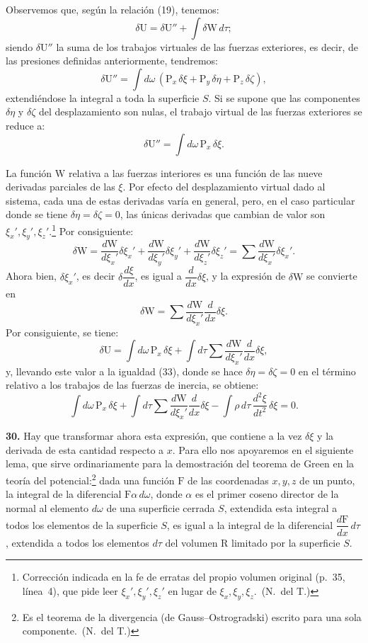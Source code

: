 Observemos que, según la relación (19), tenemos:
\[
\delta\mathrm{U}=\delta\mathrm{U}''+\int\delta\mathrm{W}\,d\tau;
\]
siendo $\delta\mathrm{U}''$ la suma de los trabajos virtuales de las
fuerzas exteriores, es decir, de las presiones definidas anteriormente,
tendremos:
\[
\delta\mathrm{U}''=\int d\omega\,(\mathrm{P}_x\,\delta\xi+\mathrm{P}_y\,\delta\eta+\mathrm{P}_z\,\delta\zeta),
\]
extendiéndose la integral a toda la superficie $S$. Si se supone que las
componentes $\delta\eta$ y $\delta\zeta$ del desplazamiento son nulas, el
trabajo virtual de las fuerzas exteriores se reduce a:
\[
\delta\mathrm{U}''=\int d\omega\,\mathrm{P}_x\,\delta\xi.
\]

La función $\mathrm{W}$ relativa a las fuerzas
interiores es una función de las nueve derivadas parciales de las $\xi$.
Por efecto del desplazamiento virtual dado al sistema, cada una de estas
derivadas varía en general, pero, en el caso particular donde se tiene
$\delta\eta=\delta\zeta=0$, las únicas derivadas que cambian de valor son
$\xi_x',\xi_y',\xi_z'$.\footnote{Corrección indicada en la fe de erratas del
propio volumen original (p.~35, línea~4), que pide leer
$\xi_x',\xi_y',\xi_z'$ en lugar de $\xi_x,\xi_y,\xi_z$.~(N.~del T.)} Por consiguiente:
\[
\delta\mathrm{W}=\frac{d\mathrm{W}}{d\xi_x'}\delta\xi_x'+\frac{d\mathrm{W}}{d\xi_y'}\delta\xi_y'+\frac{d\mathrm{W}}{d\xi_z'}\delta\xi_z'
=\sum\frac{d\mathrm{W}}{d\xi_x'}\delta\xi_x'.
\]
Ahora bien, $\delta\xi_x'$, es decir $\delta\dfrac{d\xi}{dx}$, es igual a
$\dfrac{d}{dx}\delta\xi$, y la expresión de $\delta\mathrm{W}$ se convierte
en
\[
\delta\mathrm{W}=\sum\frac{d\mathrm{W}}{d\xi_x'}\frac{d}{dx}\delta\xi.
\]
Por consiguiente, se tiene:
\[
\delta\mathrm{U}=\int d\omega\,\mathrm{P}_x\,\delta\xi+\int d\tau\sum\frac{d\mathrm{W}}{d\xi_x'}\frac{d}{dx}\delta\xi,
\]
y, llevando este valor a la igualdad (33), donde se hace $\delta\eta=\delta\zeta=0$
en el término relativo a los trabajos de las fuerzas de inercia, se
obtiene:
\begin{equation}
\int d\omega\,\mathrm{P}_x\,\delta\xi+\int d\tau\sum\frac{d\mathrm{W}}{d\xi_x'}\frac{d}{dx}\delta\xi
-\int \rho\,d\tau\,\frac{d^2\xi}{dt^2}\,\delta\xi=0.
\tag{34}
\end{equation}

\noindent\textbf{30.} Hay que transformar ahora esta expresión, que
contiene a la vez $\delta\xi$ y la derivada de esta cantidad respecto a
$x$. Para ello nos apoyaremos en el siguiente lema, que sirve
ordinariamente para la demostración del teorema de Green en la teoría del
potencial:\footnote{Es el teorema de la divergencia (de
Gauss--Ostrogradski) escrito para una sola componente.~(N.~del T.)} dada una función $\mathrm{F}$ de las coordenadas
$x,y,z$ de un punto, la integral de la diferencial $\mathrm{F}\alpha\,d\omega$,
donde $\alpha$ es el primer coseno director de la normal al elemento
$d\omega$ de una superficie cerrada $S$, extendida esta integral a todos
los elementos de la superficie $S$, es igual a la integral de la
diferencial $\dfrac{d\mathrm{F}}{dx}\,d\tau$, extendida a todos los
elementos $d\tau$ del volumen $\mathrm{R}$ limitado por la superficie $S$.

